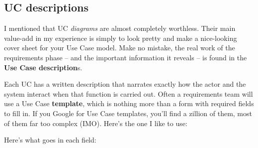 \subsection{UC descriptions}

I mentioned that UC \textit{diagrams} are almost completely worthless. Their
main value-add in my experience is simply to look pretty and make a
nice-looking cover sheet for your Use Case model. Make no mistake, the real
work of the requirements phase -- and the important information it reveals --
is found in the \textbf{Use Case description}s.

Each UC has a written description that narrates exactly how the actor and the
system interact when that function is carried out. Often a requirements team
will use a Use Case \textbf{template}, which is nothing more than a form with
required fields to fill in. If you Google for Use Case templates, you'll find
a zillion of them, most of them far too complex (IMO). Here's the one I like
to use:

\begin{center}
\end{center}

Here's what goes in each field:
\vspace{-.1in}

